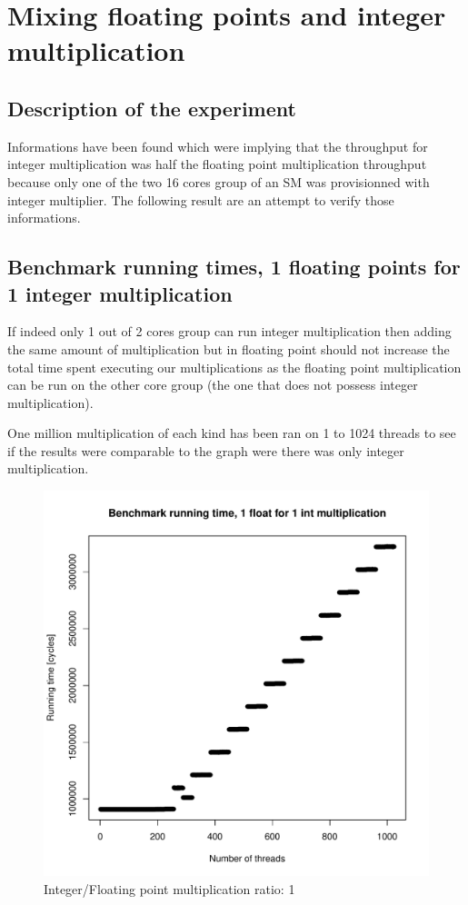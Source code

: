 \documentclass{article}
\begin{document}
\section{Mixing floating points and integer multiplication}
	\subsection{Description of the experiment}
	Informations have been found which were implying that the throughput for integer multiplication was half the floating point multiplication throughput because only one of the two 16 cores group of an SM was provisionned with integer multiplier.
	The following result are an attempt to verify those informations.
	\subsection{Benchmark running times, 1 floating points for 1 integer multiplication}
	If indeed only 1 out of 2 cores group can run integer multiplication then adding the same amount of multiplication but in floating point should not increase the total time spent executing our multiplications as the floating point multiplication can be run on the other core group (the one that does not possess integer multiplication).
	
	One million multiplication of each kind has been ran on 1 to 1024 threads to see if the results were comparable to the graph were there was only integer multiplication.
	\begin{figure}[h]
		\centering
		\vspace{-20pt}
    			\includegraphics[width=\linewidth]{"graphics/running_times_ratio11"}
		\vspace{-20pt}
		\caption{Integer/Floating point multiplication ratio: 1}
	\end{figure}
	\pagebreak
\end{document}
